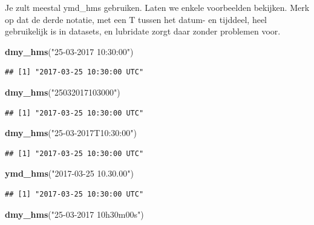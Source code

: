 \documentclass[]{tufte-book}
\newenvironment{Shaded}{}{}
\newcommand{\KeywordTok}[1]{\textcolor[rgb]{0.00,0.44,0.13}{\textbf{#1}}}
\newcommand{\NormalTok}[1]{#1}
\newcommand{\StringTok}[1]{\textcolor[rgb]{0.25,0.44,0.63}{#1}}
\begin{document}
Je zult meestal ymd\_hms gebruiken. Laten we enkele voorbeelden bekijken. Merk op dat de derde notatie, met een T tussen het datum- en tijddeel, heel gebruikelijk is in datasets, en lubridate zorgt daar zonder problemen voor.

\begin{Shaded}
\begin{Highlighting}[]
\KeywordTok{dmy_hms}\NormalTok{(}\StringTok{"25-03-2017 10:30:00"}\NormalTok{)}
\end{Highlighting}
\end{Shaded}

\begin{verbatim}
## [1] "2017-03-25 10:30:00 UTC"
\end{verbatim}

\begin{Shaded}
\begin{Highlighting}[]
\KeywordTok{dmy_hms}\NormalTok{(}\StringTok{"25032017103000"}\NormalTok{)}
\end{Highlighting}
\end{Shaded}

\begin{verbatim}
## [1] "2017-03-25 10:30:00 UTC"
\end{verbatim}

\begin{Shaded}
\begin{Highlighting}[]
\KeywordTok{dmy_hms}\NormalTok{(}\StringTok{"25-03-2017T10:30:00"}\NormalTok{)}
\end{Highlighting}
\end{Shaded}

\begin{verbatim}
## [1] "2017-03-25 10:30:00 UTC"
\end{verbatim}

\begin{Shaded}
\begin{Highlighting}[]
\KeywordTok{ymd_hms}\NormalTok{(}\StringTok{"2017-03-25 10.30.00"}\NormalTok{)}
\end{Highlighting}
\end{Shaded}

\begin{verbatim}
## [1] "2017-03-25 10:30:00 UTC"
\end{verbatim}

\begin{Shaded}
\begin{Highlighting}[]
\KeywordTok{dmy_hms}\NormalTok{(}\StringTok{"25-03-2017 10h30m00s"}\NormalTok{)}
\end{Highlighting}
\end{Shaded}
\end{document}
